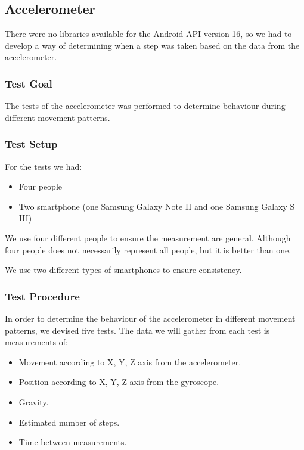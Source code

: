 \subsection{Accelerometer}
There were no libraries available for the Android API version 16, so we had to develop a way of determining when a step was taken based on the data from the accelerometer.

\subsubsection{Test Goal}
The tests of the accelerometer was performed to determine behaviour during different movement patterns. 

\subsubsection{Test Setup}
For the tests we had:
\begin{itemize}
\item Four people
\item Two smartphone (one Samsung Galaxy Note II and one Samsung Galaxy S III)
\end{itemize}

We use four different people to ensure the measurement are general.
Although four people does not necessarily represent all people, but it is better than one.

We use two different types of smartphones to ensure consistency.

\subsubsection{Test Procedure} 
In order to determine the behaviour of the accelerometer in different movement patterns, we devised five tests.
The data we will gather from each test is measurements of:
\begin{itemize}
\item Movement according to X, Y, Z axis from the accelerometer.
\item Position according to X, Y, Z axis from the gyroscope.
\item Gravity.
\item Estimated number of steps.
\item Time between measurements.
\end{itemize}

